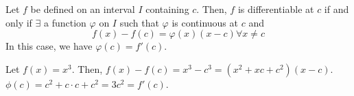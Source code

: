\begin{theorem}{}{}
    Let $f$ be defined on an interval $I$ containing $c$. Then, $f$ is differentiable at $c$ if and only if $\exists$ a function $\varphi$ on $I$ such that $\varphi$ is continuous at $c$ and $$f(x) - f(c) = \varphi(x)(x - c) \forall x \neq c$$ In this case, we have $\varphi(c) = f'(c)$.
\end{theorem}
\begin{note}
    Let $f(x) = x^3$. Then, $f(x) - f(c) = x^3 - c^3 = (x^2 + xc + c^2)(x - c)$. $\phi(c) = c^2 + c \cdot c + c^2 = 3c^2 = f'(c)$.
\end{note}